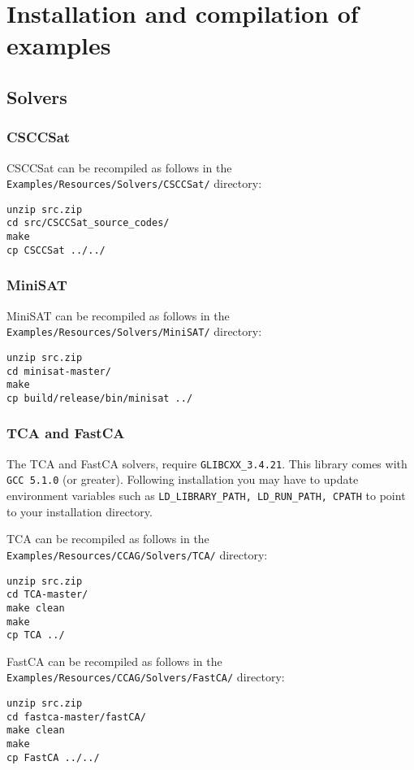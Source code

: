\documentclass{article}
\begin{document}
\section{Installation and compilation of examples}

\subsection{Solvers}

\subsubsection{CSCCSat}
CSCCSat can be recompiled as follows in the \texttt{Examples/Resources/Solvers/CSCCSat/} directory:
\begin{Verbatim}[frame=single]
unzip src.zip
cd src/CSCCSat_source_codes/
make
cp CSCCSat ../../
\end{Verbatim}

\subsubsection{MiniSAT}
MiniSAT can be recompiled as follows in the \texttt{Examples/Resources/Solvers/MiniSAT/} directory:
\begin{Verbatim}[frame=single]
unzip src.zip
cd minisat-master/
make
cp build/release/bin/minisat ../
\end{Verbatim}

\subsubsection{TCA and FastCA}
The TCA and FastCA solvers, require \texttt{GLIBCXX\_3.4.21}. This library comes with \texttt{GCC 5.1.0} (or greater). Following installation you may have to update environment variables such as \texttt{LD\_LIBRARY\_PATH, LD\_RUN\_PATH, CPATH} to point to your installation directory.

TCA can be recompiled as follows in the \texttt{Examples/Resources/CCAG/Solvers/TCA/} directory:
\begin{Verbatim}[frame=single]
unzip src.zip
cd TCA-master/
make clean
make
cp TCA ../
\end{Verbatim}

FastCA can be recompiled as follows in the \texttt{Examples/Resources/CCAG/Solvers/FastCA/} directory:
\begin{Verbatim}[frame=single]
unzip src.zip
cd fastca-master/fastCA/
make clean
make
cp FastCA ../../
\end{Verbatim}
\end{document}
